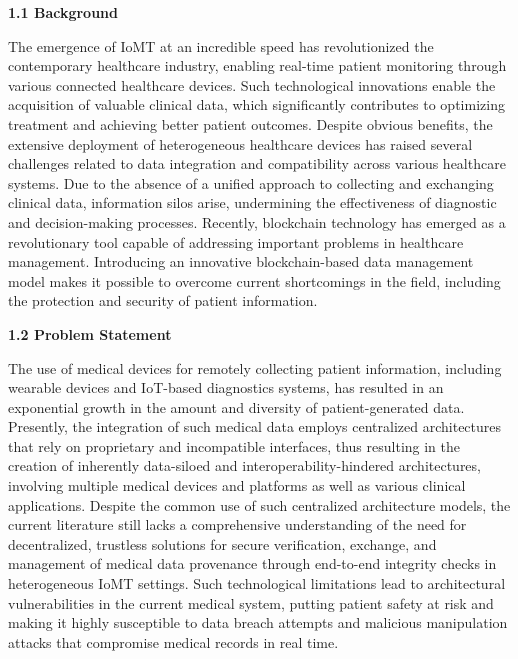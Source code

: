 \documentclass[12pt, a4paper]{report}
\begin{document}
\newpage
\setlength{\parskip}{1em} 

{\color{myblue} \Large \bfseries 1.1 Background}

\noindent The emergence of IoMT at an incredible speed has revolutionized the contemporary healthcare industry, enabling real-time patient monitoring through various connected healthcare devices. Such technological innovations enable the acquisition of valuable clinical data, which significantly contributes to optimizing treatment and achieving better patient outcomes. Despite obvious benefits, the extensive deployment of heterogeneous healthcare devices has raised several challenges related to data integration and compatibility across various healthcare systems. Due to the absence of a unified approach to collecting and exchanging clinical data, information silos arise, undermining the effectiveness of diagnostic and decision-making processes. Recently, blockchain technology has emerged as a revolutionary tool capable of addressing important problems in healthcare management. Introducing an innovative blockchain-based data management model makes it possible to overcome current shortcomings in the field, including the protection and security of patient information.

\vspace{0.5cm}

{\color{myblue} \Large \bfseries 1.2 Problem Statement}

\noindent The use of medical devices for remotely collecting patient information, including wearable devices and IoT-based diagnostics systems, has resulted in an exponential growth in the amount and diversity of patient-generated data. Presently, the integration of such medical data employs centralized architectures that rely on proprietary and incompatible interfaces, thus resulting in the creation of inherently data-siloed and interoperability-hindered architectures, involving multiple medical devices and platforms as well as various clinical applications. Despite the common use of such centralized architecture models, the current literature still lacks a comprehensive understanding of the need for decentralized, trustless solutions for secure verification, exchange, and management of medical data provenance through end-to-end integrity checks in heterogeneous IoMT settings. Such technological limitations lead to architectural vulnerabilities in the current medical system, putting patient safety at risk and making it highly susceptible to data breach attempts and malicious manipulation attacks that compromise medical records in real time.
\end{document}
